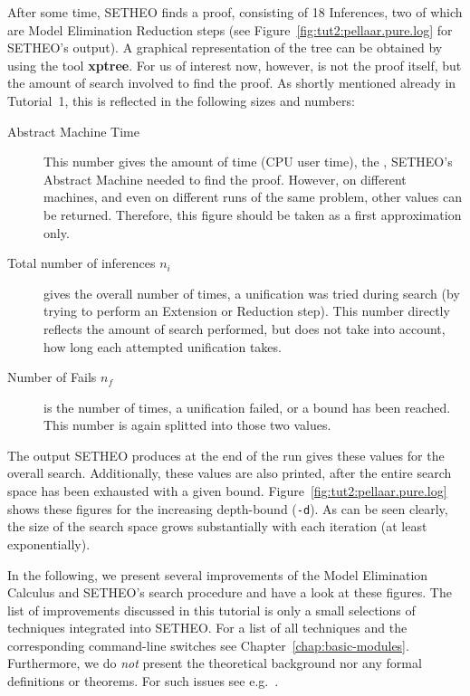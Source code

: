 After some time, SETHEO finds a proof, consisting of 18 Inferences,
two of which are Model Elimination Reduction steps
(see Figure~\ref{fig:tut2:pellaar.pure.log}  for SETHEO's output).
A graphical representation
of the tree can be obtained by using the tool {\bf xptree}.
For us of interest now, however, is not the proof itself, but the amount
of search involved to find the proof.
As shortly mentioned already in Tutorial~1, 
this is reflected in the following sizes and numbers:

\begin{description}
\item[Abstract Machine Time] This number gives the amount of time (CPU user 
time),
the \SAM, SETHEO's Abstract Machine needed to find the proof. 
However, on different machines, and even on different runs of the same
problem, other values can be returned. Therefore, this figure should be
taken as a first approximation only.
\item[Total number of inferences $n_i$] gives the overall number of times,
a unification was tried during search (by trying to perform an
Extension or Reduction step). This number directly reflects the amount
of search performed, but does not take into account, how long each
attempted unification takes.

\item[Number of Fails $n_f$] is the number of times, a unification failed,
or a bound has been reached. This number is again splitted into those
two values.
\end{description}

The output SETHEO produces at the end of the run gives these values
for the overall search. Additionally, these values are also
printed, after the entire search space has been exhausted with a given
bound. Figure~\ref{fig:tut2:pellaar.pure.log} shows these figures
for the increasing depth-bound ({\tt -d}). As can be seen clearly,
the size of the search space grows substantially with each iteration
(at least exponentially).

In the following, we present several improvements of the Model
Elimination Calculus and SETHEO's search procedure and have a look
at these figures.
The list of improvements discussed in this tutorial
is only a small selections of techniques integrated into SETHEO.
For a list of all techniques and the corresponding command-line
switches see Chapter~\ref{chap:basic-modules}.
Furthermore, we do {\em not\/} present the theoretical background
nor any formal definitions or theorems. For such issues see
e.g.\ \cite{LSBB89,LMG94,Letzdiss,Mayrdiss}.

